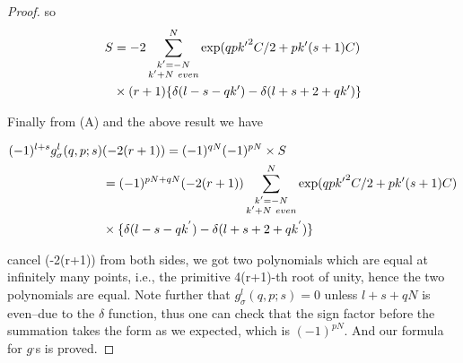 \begin{proof}
so
\begin{align} S&=-2\sum_{ \substack {k'=-N\\ k'+N\ even}}^N \exp(qp{k^\prime}^2C/2+pk'(s+1)C)\notag\\
&\times(r+1)\{\delta (l-s-qk')-\delta (l+s+2+qk')\}\notag\end{align}

Finally from (A) and the above result we have

\begin{align} (-1)^{l+s}g_\sigma^l(q,p;s)&(-2(r+1))=(-1)^{qN}(-1)^{pN}\times S\notag\\
&=(-1)^{pN+qN}(-2(r+1))\sum_{ \substack {k'=-N\\ k'+N\ even}}^N \exp(qp{k^\prime}^2C/2+pk'(s+1)C)\notag\\
&\times\{\delta(l-s-qk^{'})-\delta(l+s+2+qk^{'})\}\notag\end{align}

cancel (-2(r+1)) from both sides, we got two polynomials which are equal at infinitely many points, i.e., the primitive
4(r+1)-th root of unity, hence the two polynomials are equal. Note further that $g_\sigma^l(q,p;s)=0$ unless $l+s+qN$ is
even--due to the $\delta$ function, thus one can check that the sign factor before the summation takes the form as we expected,
which is $(-1)^{pN}$. And our formula for $g^{,}$s is proved.

\end{proof}
